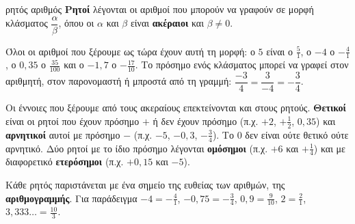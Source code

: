 \begin{orismos}{ρητός αριθμός}
\textbf{Ρητοί} λέγονται οι αριθμοί που μπορούν να γραφούν σε μορφή κλάσματος $\dfrac{\alpha}{\beta}$, όπου οι $\alpha$ και $\beta$ είναι \textbf{ακέραιοι} και $\beta\neq0$.
\end{orismos}

Όλοι οι αριθμοί που ξέρουμε ως τώρα έχουν αυτή τη μορφή: ο $5$ είναι ο $\frac{5}{1}$, ο $-4$ ο $-\frac{4}{1}$, ο $0{,}35$ ο $\frac{35}{100}$ και ο $-1{,}7$ ο $-\frac{17}{10}$. Το πρόσημο ενός κλάσματος μπορεί να γραφεί στον αριθμητή, στον παρονομαστή ή μπροστά από τη γραμμή: $\dfrac{-3}{4}=\dfrac{3}{-4}=-\dfrac{3}{4}$.

Οι έννοιες που ξέρουμε από τους ακεραίους επεκτείνονται και στους ρητούς. \textbf{Θετικοί} είναι οι ρητοί που έχουν πρόσημο $+$ ή δεν έχουν πρόσημο (π.χ. $+2$, $+\frac{1}{2}$, $0{,}35$) και \textbf{αρνητικοί} αυτοί με πρόσημο $-$ (π.χ. $-5$, $-0{,}3$, $-\frac{3}{4}$). Το $0$ δεν είναι ούτε θετικό ούτε αρνητικό. Δύο ρητοί με το ίδιο πρόσημο λέγονται \textbf{ομόσημοι} (π.χ. $+6$ και $+\frac{1}{4}$) και με διαφορετικό \textbf{ετερόσημοι} (π.χ. $+0{,}15$ και $-5$).


Κάθε ρητός παριστάνεται με ένα σημείο της ευθείας των αριθμών, της \textbf{αριθμογραμμής}. Για παράδειγμα $-4=-\frac{4}{1}$, $-0{,}75=-\frac{3}{4}$, $0{,}9=\frac{9}{10}$, $2=\frac{2}{1}$, $3{,}333\ldots=\frac{10}{3}$.

\begin{center}
\end{center}

\begin{center}
\end{center}

